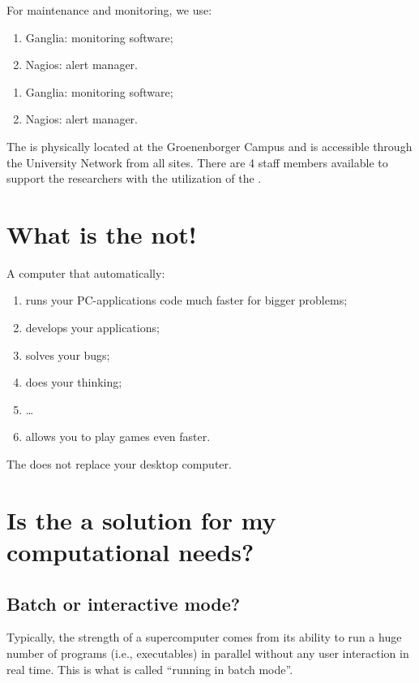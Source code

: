 For maintenance and monitoring, we use:
\ifantwerpen
    \begin{enumerate}
      \item  Ganglia: monitoring software;
      \item  Nagios: alert manager.
    \end{enumerate}
\fi
\ifleuven
    \begin{enumerate}
      \item  Ganglia: monitoring software;
      \item  Nagios: alert manager.
    \end{enumerate}
\fi

\ifantwerpen
The \hpc is physically located at the Groenenborger Campus and is accessible
through the University Network from all \university sites. There are 4 staff members
available to support the researchers with the utilization of the \hpc.
\fi

\section{What is the \hpc not!}
\label{sec:what-is-the-hpc-not}

A computer that automatically:
\begin{enumerate}
  \item  runs your PC-applications code much faster for bigger problems;
  \item  develops your applications;
  \item  solves your bugs;
  \item  does your thinking;
  \item  \dots
  \item  allows you to play games even faster.
\end{enumerate}
The \hpc does not replace your desktop computer.

\section{Is the \hpc a solution for my computational needs?}
\label{sec:is-the-hpc-a-solution-for-my-computational-needs}

\subsection{Batch or interactive mode?}
\label{sec:batch-or-interactive-mode}

Typically, the strength of a supercomputer comes from its ability to run a huge
number of programs (i.e., executables) in parallel without any user interaction
in real time. This is what is called ``running in batch mode''.

